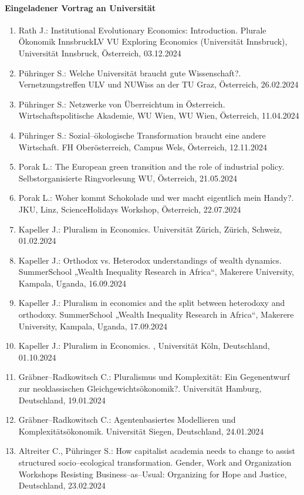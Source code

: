 \paragraph{Eingeladener Vortrag an Universität}
\begin{enumerate}
	\item Rath J.: Institutional Evolutionary Economics: Introduction. Plurale Ökonomik InnsbruckLV VU Exploring Economics (Universität Innsbruck), Universität Innsbruck, Österreich, 03.12.2024
	\item Pühringer S.: Welche Universität braucht gute Wissenschaft?. Vernetzungstreffen ULV und NUWiss an der TU Graz, Österreich, 26.02.2024
	\item Pühringer S.: Netzwerke von Überreichtum in Österreich. Wirtschaftspolitische Akademie, WU Wien, WU Wien, Österreich, 11.04.2024
	\item Pühringer S.: Sozial--ökologische Transformation braucht eine andere Wirtschaft. FH Oberösterreich, Campus Wels, Österreich, 12.11.2024
	\item Porak L.: The European green transition and the role of industrial policy. Selbstorganisierte Ringvorlesung WU, Österreich, 21.05.2024
	\item Porak L.: Woher kommt Schokolade und wer macht eigentlich mein Handy?. JKU, Linz, ScienceHolidays Workshop, Österreich, 22.07.2024
	\item Kapeller J.: Pluralism in Economics. Universität Zürich, Zürich, Schweiz, 01.02.2024
	\item Kapeller J.: Orthodox vs. Heterodox understandings of wealth dynamics. SummerSchool „Wealth Inequality Research in  Africa“, Makerere University, Kampala, Uganda, 16.09.2024
	\item Kapeller J.: Pluralism in economics and the split between heterodoxy and orthodoxy. SummerSchool „Wealth Inequality Research in  Africa“, Makerere University, Kampala, Uganda, 17.09.2024
	\item Kapeller J.: Pluralism in Economics. , Universität Köln, Deutschland, 01.10.2024
	\item Gräbner--Radkowitsch C.: Pluralismus und Komplexität: Ein Gegenentwurf zur neoklassischen Gleichgewichtsökonomik?. Universität Hamburg, Deutschland, 19.01.2024
	\item Gräbner--Radkowitsch C.: Agentenbasiertes Modellieren und Komplexitätsökonomik. Universität Siegen, Deutschland, 24.01.2024
	\item Altreiter C., Pühringer S.: How capitalist academia needs to change to assist structured socio--ecological transformation. Gender, Work and Organization Workshops Resisting Business--as--Usual: Organizing for Hope and Justice, Deutschland, 23.02.2024
\end{enumerate}
